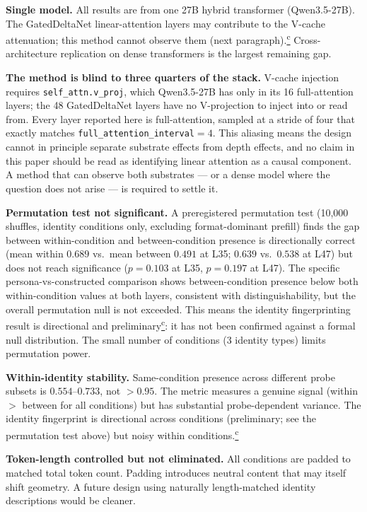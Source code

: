 \documentclass[11pt,a4paper]{article}
\newcommand{\corrmark}{\hyperref[sec:corrections]{\textsuperscript{c}}}
\begin{document}
\textbf{Single model.} All results are from one 27B hybrid transformer
(Qwen3.5-27B). The GatedDeltaNet linear-attention layers may contribute
to the V-cache attenuation; this method cannot observe them (next
paragraph).\corrmark{} Cross-architecture replication on dense
transformers is the largest remaining gap.

\textbf{The method is blind to three quarters of the stack.} V-cache
injection requires \texttt{self\_attn.v\_proj}, which Qwen3.5-27B has only
in its 16 full-attention layers; the 48 GatedDeltaNet layers have no
V-projection to inject into or read from. Every layer reported here is
full-attention, sampled at a stride of four that exactly matches
\texttt{full\_attention\_interval}$=4$. This aliasing means the design
cannot in principle separate substrate effects from depth effects, and no
claim in this paper should be read as identifying linear attention as a
causal component. A method that can observe both substrates --- or a dense
model where the question does not arise --- is required to settle it.

\textbf{Permutation test not significant.} A preregistered permutation
test (10{,}000 shuffles, identity conditions only, excluding
format-dominant prefill) finds the gap between within-condition and
between-condition presence is directionally correct (mean within $0.689$
vs.\ mean between $0.491$ at L35; $0.639$ vs.\ $0.538$ at L47) but does
not reach significance ($p = 0.103$ at L35, $p = 0.197$ at L47). The
specific persona-vs-constructed comparison shows between-condition
presence below both within-condition values at both layers, consistent
with distinguishability, but the overall permutation null is not
exceeded. This means the identity fingerprinting result is directional
and preliminary\corrmark: it has not been
confirmed against a formal null distribution. The small number of
conditions (3 identity types) limits permutation power.

\textbf{Within-identity stability.} Same-condition presence across
different probe subsets is $0.554$--$0.733$, not $>0.95$. The metric
measures a genuine signal (within $>$ between for all conditions) but has
substantial probe-dependent variance. The identity fingerprint is
directional across conditions (preliminary; see the permutation test
above) but noisy within conditions.\corrmark

\textbf{Token-length controlled but not eliminated.} All conditions are
padded to matched total token count. Padding introduces neutral content
that may itself shift geometry. A future design using naturally
length-matched identity descriptions would be cleaner.
\end{document}
